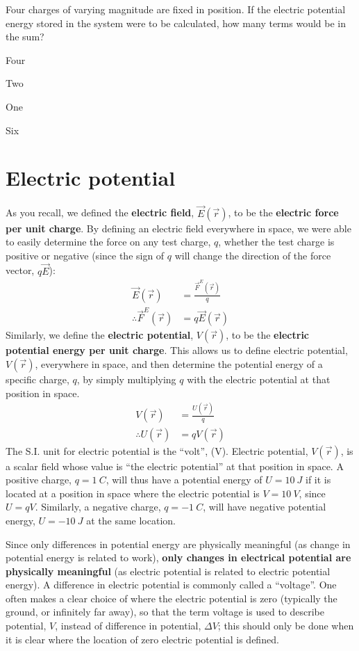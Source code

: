 \begin{checkpoint}
	\begin{MCquestion}{Four charges of varying magnitude are fixed in position. If the electric potential energy stored in the system were to be calculated, how many terms would be in the sum?}
		\item Four
		\item Two
		\item One
		\item Six \correct
	\end{MCquestion}
\end{checkpoint}


\section{Electric potential}
As you recall, we defined the \textbf{electric field}, $\vec E(\vec r)$, to be the \textbf{electric force per unit charge}. By defining an electric field everywhere in space, we were able to easily determine the force on any test charge, $q$, whether the test charge is positive or negative (since the sign of $q$ will change the direction of the force vector, $q\vec E$):
\begin{align*}
\vec E(\vec r) &= \frac{\vec F^E(\vec r)}{q}\\
\therefore \vec F^E(\vec r)&=q\vec E(\vec r)
\end{align*}
Similarly, we define the \textbf{electric potential}, $V(\vec r)$, to be the \textbf{electric potential energy per unit charge}. This allows us to define electric potential, $V(\vec r)$, everywhere in space, and then determine the potential energy of a specific charge, $q$, by simply multiplying $q$ with the electric potential at that position in space.
\begin{align*}
V(\vec r) &= \frac{ U(\vec r)}{q}\\
\therefore U(\vec r)&= q V(\vec r)
\end{align*}
The S.I. unit for electric potential is the ``volt'', (V). Electric potential, $V(\vec r)$, is a scalar field whose value is ``the electric potential'' at that position in space. A positive charge, $q=\SI{1}{C}$, will thus have a potential energy of $U=\SI{10}{J}$ if it is located at a position in space where the electric potential is $V=\SI{10}{V}$, since $U=qV$. Similarly, a negative charge, $q=\SI{-1}{C}$, will have negative potential energy, $U=\SI{-10}{J}$ at the same location.

Since only differences in potential energy are physically meaningful (as change in potential energy is related to work), \textbf{only changes in electrical potential are physically meaningful} (as electric potential is related to electric potential energy). A difference in electric potential is commonly called a ``voltage''. One often makes a clear choice of where the electric potential is zero (typically the ground, or infinitely far away), so that the term voltage is used to describe potential, $V$, instead of difference in potential, $\Delta V$; this should only be done when it is clear where the location of zero electric potential is defined.

